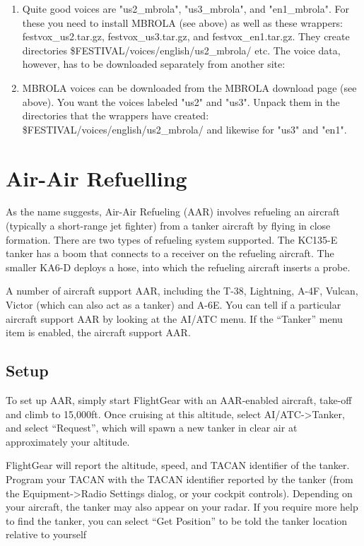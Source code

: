 \begin{enumerate}
\begin{enumerate}
\item Quite good voices are "us2\_mbrola", "us3\_mbrola", and "en1\_mbrola". For these you need to
install MBROLA (see above) as well as these wrappers: festvox\_us2.tar.gz, festvox\_us3.tar.gz,
and festvox\_en1.tar.gz. They create directories \$FESTIVAL/voices/english/us2\_mbrola/ etc.
The voice data, however, has to be downloaded separately from another site:

\item MBROLA voices can be downloaded from the MBROLA download page (see above).
You want the voices labeled "us2" and "us3". Unpack them in the directories that
the wrappers have created: \$FESTIVAL/voices/english/us2\_mbrola/ and likewise for "us3" and "en1".

\end{enumerate}

\section{Air-Air Refuelling}\label{aar}

As the name suggests, Air-Air Refueling (AAR) involves refueling an aircraft
(typically a short-range jet fighter) from a tanker aircraft by flying in close
formation. There are two types of refueling system supported. The KC135-E tanker
has a boom that connects to a receiver on the refueling aircraft. The smaller
KA6-D deploys a hose, into which the refueling aircraft inserts a probe.

A number of aircraft support AAR, including the T-38, Lightning, A-4F, Vulcan,
Victor (which can also act as a tanker) and A-6E. You can tell if a particular
aircraft support AAR by looking at the AI/ATC menu. If the ``Tanker'' menu item
is enabled, the aircraft support AAR.

\subsection{Setup}

To set up AAR, simply start FlightGear with an AAR-enabled aircraft, take-off
and climb to 15,000ft. Once cruising at this altitude, select AI/ATC->Tanker,
and select ``Request'', which will spawn a new tanker in clear air at
approximately your altitude.

FlightGear will report the altitude, speed, and TACAN identifier of the tanker.
Program your TACAN with the TACAN identifier reported by the tanker (from the
Equipment->Radio Settings dialog, or your cockpit controls). Depending on your
aircraft, the tanker may also appear on your radar. If you require more help to
find the tanker, you can select ``Get Position'' to be told the tanker
location relative to yourself


\end{enumerate}
